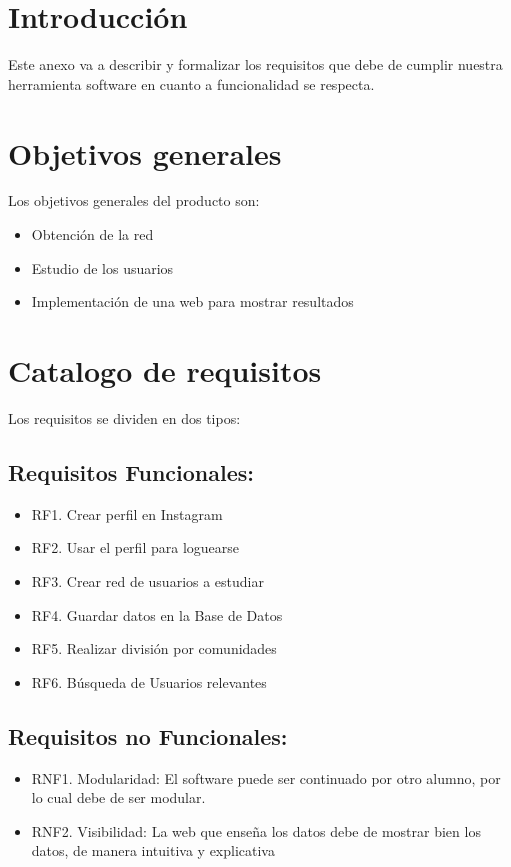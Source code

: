 
\section{Introducción}
Este anexo va a describir y formalizar los requisitos que debe de cumplir nuestra herramienta software en cuanto a funcionalidad se respecta.
\section{Objetivos generales}
Los objetivos generales del producto son:
\begin{itemize}
    \item Obtención de la red
    \item Estudio de los usuarios
    \item Implementación de una web para mostrar resultados
\end{itemize}



\section{Catalogo de requisitos}
Los requisitos se dividen en dos tipos:
\subsection{Requisitos Funcionales:}
\begin{itemize}
    \item RF1. Crear perfil en Instagram
    \item RF2. Usar el perfil para loguearse
    \item RF3. Crear red de usuarios a estudiar
    \item RF4. Guardar datos en la Base de Datos
    \item RF5. Realizar división por comunidades
    \item RF6. Búsqueda de Usuarios relevantes
\end{itemize}

\subsection{Requisitos no Funcionales:}
\begin{itemize}
    \item RNF1. Modularidad: El software puede ser continuado por otro alumno, por lo cual debe de ser modular.
    \item RNF2. Visibilidad: La web que enseña los datos debe de mostrar bien los datos, de manera intuitiva y explicativa
\end{itemize}


